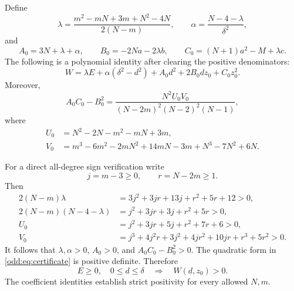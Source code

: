 \documentclass[11pt,a4paper]{article}
\begin{document}
Define
\begin{equation}\label{odd:eq:lambda}
 \lambda=\frac{m^2-mN+3m+N^2-4N}{2(N-m)},\qquad
 \alpha=\frac{N-4-\lambda}{\delta^2},
\end{equation}
and
\[
 A_0=3N+\lambda+\alpha,\qquad
 B_0=-2Na-2\lambda b,\qquad
 C_0=(N+1)a^2-M+\lambda c.
\]
The following is a polynomial identity after clearing the positive denominators:
\begin{equation}\label{odd:eq:certificate}
 \boxed{\quad
 W=\lambda E+\alpha(\delta^2-d^2)
   +A_0d^2+2B_0dz_0+C_0z_0^2.\quad}
\end{equation}
Moreover,
\begin{equation}\label{odd:eq:det}
 A_0C_0-B_0^2
 =\frac{N^2U_0V_0}{(N-2m)^2(N-2)^2(N-1)},
\end{equation}
where
\begin{align*}
 U_0&=N^2-2N-m^2-mN+3m,\\
 V_0&=m^3-6m^2-2mN^2+14mN-3m+N^3-7N^2+6N.
\end{align*}

For a direct all-degree sign verification write
\[
 j=m-3\ge0,\qquad r=N-2m\ge1.
\]
Then
\begin{align}
 2(N-m)\lambda
 &=3j^2+3jr+13j+r^2+5r+12>0,\label{odd:eq:lambda_pos}\\
 2(N-m)(N-4-\lambda)
 &=j^2+3jr+3j+r^2+5r>0,\label{odd:eq:alpha_pos}\\
 U_0&=j^2+3jr+5j+r^2+7r+6>0,\label{odd:eq:U_pos}\\
 V_0&=j^3+4j^2r+3j^2+4jr^2+10jr+r^3+5r^2>0.\label{odd:eq:V_pos}
\end{align}
It follows that $\lambda,\alpha>0$, $A_0>0$, and $A_0C_0-B_0^2>0$.
The quadratic form in \eqref{odd:eq:certificate} is positive definite. Therefore
\begin{equation}\label{odd:eq:Wpositive}
 E\ge0,\quad 0\le d\le\delta\quad\Longrightarrow\quad W(d,z_0)>0.
\end{equation}
The coefficient identities establish strict positivity for every allowed $N,m$.
\end{document}
